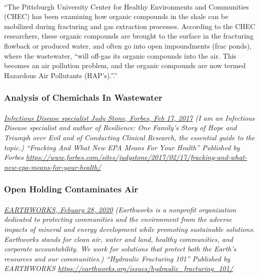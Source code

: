 \documentclass{article}
\begin{document}
\paragraph{}
``The Pittsburgh University Center for Healthy Environments and Communities (CHEC) has been examining how organic compounds in the shale can be mobilized during fracturing and gas extraction processes. According to the CHEC researchers, these organic compounds are brought to the surface in the fracturing flowback or produced water, and often go into open impoundments (frac ponds), where the wastewater, “will off-gas its organic compounds into the air. This becomes an air pollution problem, and the organic compounds are now termed Hazardous Air Pollutants (HAP’s).”.''


\subsubsection{Analysis of Chemichals In Wastewater}
\paragraph{}
\small
\textit{
\underline{Infectious Disease specialist Judy Stone, Forbes, Feb 17, 2017}
(I am an Infectious Disease specialist and author of Resilience: One Family's Story of Hope and Triumph over Evil and of Conducting Clinical Research, the essential guide to the topic.) ``Fracking And What New EPA Means For Your Health'' Published by Forbes   
\url{https://www.forbes.com/sites/judystone/2017/02/17/fracking-and-what-new-epa-means-for-your-health/}}
\normalsize


\subsubsection{Open Holding Contaminates Air}
\paragraph{}
\small
\textit{
\underline{EARTHWORKS, Febuary 28, 2020}
(Earthworks is a nonprofit organization dedicated to protecting communities and the environment from the adverse impacts of mineral and energy development while promoting sustainable solutions. Earthworks stands for clean air, water and land, healthy communities, and corporate accountability. We work for solutions that protect both the Earth’s resources and our communities.) “Hydraulic Fracturing 101” Published by EARTHWORKS 
\url{https://earthworks.org/issues/hydraulic_fracturing_101/}}
\normalsize
\end{document}
